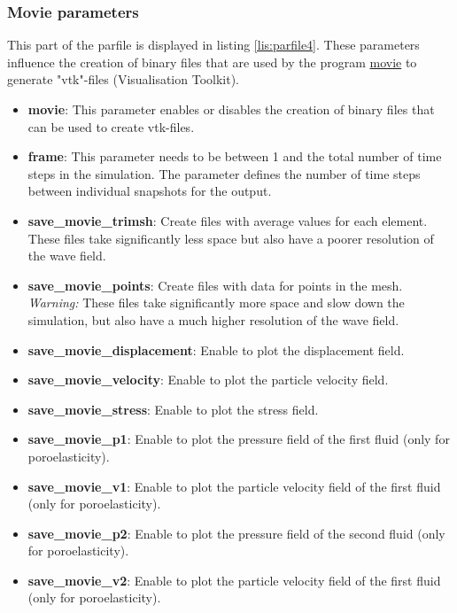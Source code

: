     	\subsubsection{Movie parameters}
    	\label{subsubsec:moviepar}
			This part of the parfile is displayed in listing \ref{lis:parfile4}. These parameters influence the creation of binary files that are used by the program \url{movie} to generate "vtk"-files (Visualisation Toolkit).
			
    		\begin{itemize}
    			\item \textbf{movie}: This parameter enables or disables the creation of binary files that can be used to create vtk-files.
    			\item \textbf{frame}: This parameter needs to be between 1 and the total number of time steps in the simulation. The parameter defines the number of time steps between individual snapshots for the output.
    			\item \textbf{save\_movie\_trimsh}: Create files with average values for each element. These files take significantly less space but also have a poorer resolution of the wave field.
    			\item \textbf{save\_movie\_points}: Create files with data for points in the mesh. \textit{Warning:} These files take significantly more space and slow down the simulation, but also have a much higher resolution of the wave field.
    			\item \textbf{save\_movie\_displacement}: Enable to plot the displacement field.
    			\item \textbf{save\_movie\_velocity}: Enable to plot the particle velocity field.
    			\item \textbf{save\_movie\_stress}: Enable to plot the stress field.
    			\item \textbf{save\_movie\_p1}: Enable to plot the pressure field of the first fluid (only for poroelasticity).
    			\item \textbf{save\_movie\_v1}: Enable to plot the particle velocity field of the first fluid (only for poroelasticity).
    			\item \textbf{save\_movie\_p2}: Enable to plot the pressure field of the second fluid (only for poroelasticity).
    			\item \textbf{save\_movie\_v2}: Enable to plot the particle velocity field of the first fluid (only for poroelasticity).
    		\end{itemize}
